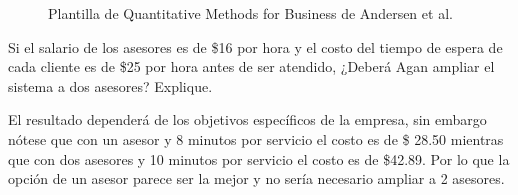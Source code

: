 \begin{problema}
\begin{enumerate}
\begin{figure}[H]
			\caption{Plantilla de Quantitative Methods for Business de Andersen et al. }
		\end{figure}
	\end{enumerate}
	
	Si el salario de los asesores es de \$16 por hora y el costo del tiempo de espera de cada cliente es de \$25 por hora antes de ser atendido, ¿Deberá Agan ampliar el sistema a dos asesores? Explique.
	\begin{sol}
		El resultado dependerá de los objetivos específicos de la empresa, sin embargo nótese que con un asesor y 8 minutos por servicio el costo es de \$ 28.50 mientras que con dos asesores y 10 minutos por servicio el costo es de \$42.89. Por lo que la opción de un asesor parece ser la mejor y no sería necesario ampliar a 2 asesores. 
	\end{sol}
	
\end{problema}

